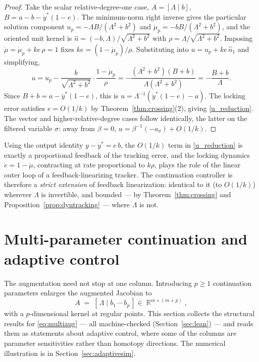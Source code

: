 \documentclass[11pt,american]{article}
\DeclareMathOperator{\R}{\mathbb{R}}
\theoremstyle{definition}
\theoremstyle{plain}
\theoremstyle{remark}
\begin{document}
\begin{proof}
Take the scalar relative-degree-one case, $A = [\Lambda \mid b]$, $B = a - b - \dot y^*(1-e)$. The minimum-norm right inverse gives the particular solution component $u_p = -\Lambda B/(\Lambda^2+b^2)$ and $\dot\mu_p = -bB/(\Lambda^2+b^2)$, and the oriented unit kernel is $\hat n = (-b,\Lambda)/\sqrt{\Lambda^2+b^2}$ with $\rho = \Lambda/\sqrt{\Lambda^2+b^2}$. Imposing $\dot\mu = \dot\mu_p + k e\,\rho = 1$ fixes $k e = (1-\dot\mu_p)/\rho$. Substituting into $u = u_p + k e\,\hat n_1$ and simplifying,
\[
u = u_p - \frac{b}{\sqrt{\Lambda^2+b^2}}\cdot\frac{1-\dot\mu_p}{\rho}
  = -\frac{(\Lambda^2+b^2)(B+b)}{\Lambda(\Lambda^2+b^2)} = -\frac{B+b}{\Lambda} .
\]
Since $B + b = a - \dot y^*(1-e)$, this is $u = \Lambda^{-1}(\dot y^*(1-e) - a)$. The locking error satisfies $e = O(1/k)$ by Theorem~\ref{thm:crossing}(2), giving \eqref{u_reduction}. The vector and higher-relative-degree cases follow identically, the latter on the filtered variable $\sigma$: away from $\beta = 0$, $u = \beta^{-1}(-a_\sigma) + O(1/k)$.
\end{proof}

Using the output identity $y - y^* = e\,b$, the $O(1/k)$ term in \eqref{u_reduction} is exactly a proportional feedback of the tracking error, and the locking dynamics $\dot e = 1 - \dot\mu$, contracting at rate proportional to $k\rho$, plays the role of the linear outer loop of a feedback-linearizing tracker. The continuation controller is therefore a \emph{strict extension} of feedback linearization: identical to it (to $O(1/k)$) wherever $\Lambda$ is invertible, and bounded --- by Theorem~\ref{thm:crossing} and Proposition~\ref{prop:dyntracking} --- where $\Lambda$ is not.

\section{Multi-parameter continuation and adaptive control}\label{sec:adaptive}

The augmentation need not stop at one column. Introducing $p \ge 1$ continuation parameters enlarges the augmented Jacobian to
\begin{equation}\label{eq:multiaug}
A \;=\; [\,\Lambda \mid b_1\,\cdots\,b_p\,] \in \R^{m\times(m+p)},
\end{equation}
with a $p$-dimensional kernel at regular points. This section collects the structural results for \eqref{eq:multiaug} --- all machine-checked (Section~\ref{sec:lean}) --- and reads them as statements about adaptive control, where some of the columns are parameter sensitivities rather than homotopy directions. The numerical illustration is in Section~\ref{sec:adaptivesim}.
\end{document}
